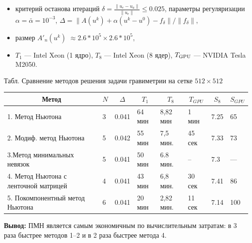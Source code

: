 \documentclass[10pt,pdf, mathserif, hyperref={unicode}]{beamer}
\begin{document}
\begin{frame}
\begin{itemize}
	\item критерий останова итераций $\delta=\frac{\|u_e-u_a\|}{\|u_e\|}\leqslant 0.025$, параметры регуляризации $\alpha=\bar{\alpha}=10^{-3}$, $\Delta=\|A(u^k)+\alpha(u^k-u^0)-f_\delta\|/\|f_\delta\|$,
	\item размер $A'_n(u^k)$  $\approx 2.6*10^5\times2.6*10^5$,
	\item $T_1$ --- Intel Xeon (1 ядро), $T_8$ --- Intel Xeon (8 ядер), $T_{\textup{GPU}}$ --- NVIDIA Tesla M2050.
\end{itemize}
	
	\begin{table}[]
		\centering
		\scriptsize{Табл. Сравнение методов решения задачи гравиметрии на сетке $512\times512$}
		\label{table3.1}
		\begin{tabular}{|p{}|l|l|l|l|l|l|l|}
			\hline
			\multicolumn{1}{|c|}{Метод}        & \multicolumn{1}{c|}{$N$} &
			\multicolumn{1}{c|}{$\Delta$} & \multicolumn{1}{c|}{$T_1$} & \multicolumn{1}{c|}{$T_8$} &
			\multicolumn{1}{c|}{$T_{GPU}$} &
			\multicolumn{1}{c|}{$S_8$} & \multicolumn{1}{c|}{$S_{GPU}$}
			\\ \hline
			1. Метод Ньютона                      &  3        & 0.041                          &       64 мин                  &     8,82 мин &
			1 мин & 7.25 & 65 \\ \hline
			2. Модиф. метод Ньютона     &         5           & 0.042            & 55 мин                  & 7,5 мин.    &
			45 сек & 7.33 & 73  \\ \hline
			3.Метод минимальных невязок &  5               & 0.041                    & 50 мин  & 6.8 мин.  &  --   & 7.3 & ---            \\ \hline
			4. Метод Ньютона с ленточной матрицей &  4               & 0.041                    & 43 мин                  & 6,8 мин. & 30 сек   & 7.41 & 86        \\ \hline
			5. Покомпонентный метод Ньютона &  6               & 0.041                    & 20 мин  & 2,82 мин.  &  11 сек   & 7.14 & 100            \\ \hline
		\end{tabular}
	\end{table}
		\textbf{\color{blue}Вывод:} ПМН является самым экономичным по вычислительным затратам: в 3 раза быстрее методов 1--2 и в 2 раза быстрее метода 4.
\end{frame}
\end{document}
